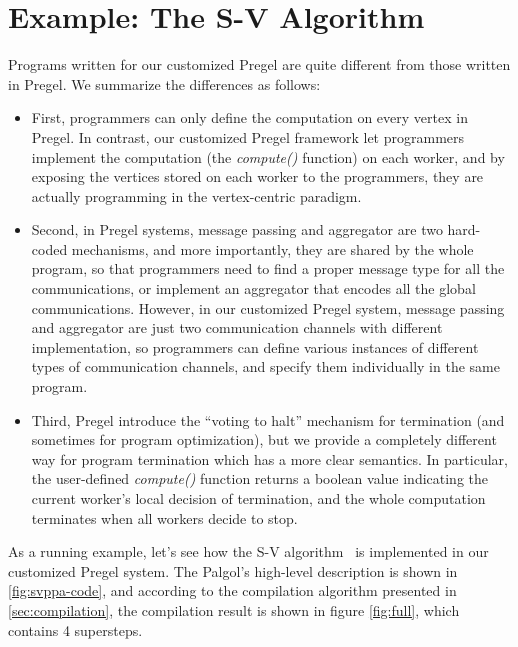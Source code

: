 \documentclass{sokendai_thesis} %
\begin{document}
\section{Example: The S-V Algorithm}

Programs written for our customized Pregel are quite different from those written in Pregel.
We summarize the differences as follows:
\begin{itemize}\setlength\itemsep{0em}
\item
 First, programmers can only define the computation on every vertex in Pregel.
 In contrast, our customized Pregel framework let programmers implement the computation (the \emph{compute()} function) on each worker, and by exposing the vertices stored on each worker to the programmers, they are actually programming in the vertex-centric paradigm.
\item
 Second, in Pregel systems, message passing and aggregator are two hard-coded mechanisms, and more importantly, they are shared by the whole program, so that programmers need to find a proper message type for all the communications, or implement an aggregator that encodes all the global communications.
 However, in our customized Pregel system, message passing and aggregator are just two communication channels with different implementation, so programmers can define various instances of different types of communication channels, and specify them individually in the same program.
\item
 Third, Pregel introduce the ``voting to halt'' mechanism for termination (and sometimes for program optimization), but we provide a completely different way for program termination which has a more clear semantics.
 In particular, the user-defined \emph{compute()} function returns a boolean value indicating the current worker's local decision of termination, and the whole computation terminates when all workers decide to stop.
\end{itemize}

As a running example, let's see how the S-V algorithm~\cite{connectivity} is implemented in our customized Pregel system.
The Palgol's high-level description is shown in \autoref{fig:svppa-code}, and according to the compilation algorithm presented in \autoref{sec:compilation}, the compilation result is shown in figure \autoref{fig:full}, which contains 4 supersteps.
\end{document}
